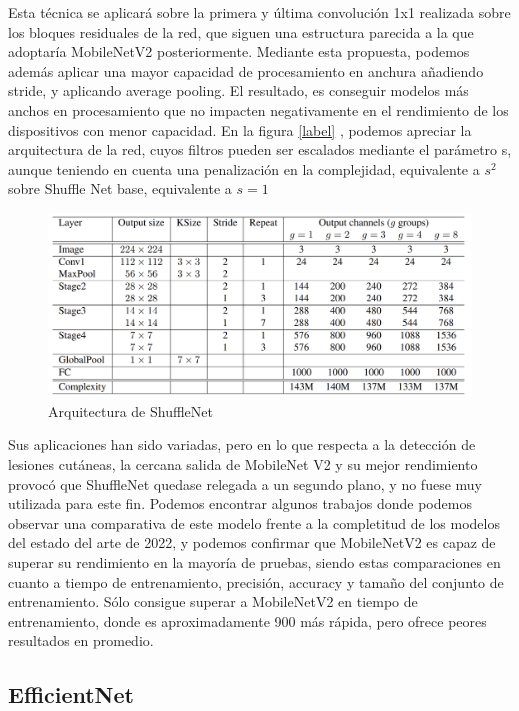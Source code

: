 Esta técnica se aplicará sobre la primera y última convolución 1x1 realizada sobre los bloques residuales de la red, que siguen una estructura parecida a la que adoptaría MobileNetV2 posteriormente. Mediante esta propuesta, podemos además aplicar una mayor capacidad de procesamiento en anchura añadiendo stride, y aplicando average pooling. El resultado, es conseguir modelos más anchos en procesamiento que no impacten negativamente en el rendimiento de los dispositivos con menor capacidad. En la figura \ref{label} , podemos apreciar la arquitectura de la red, cuyos filtros pueden ser escalados mediante el parámetro s, aunque teniendo en cuenta una penalización en la complejidad, equivalente a $s^2$ sobre Shuffle Net base, equivalente a $s=1$

\begin{figure}[H]
		\label{arquitecturashuffle}
		\centering
		\includegraphics[scale = 0.2]{imagenes/arquitecturashuffle.png}
		\caption{Arquitectura de ShuffleNet}
	\end{figure}

Sus aplicaciones han sido variadas, pero en lo que respecta a la detección de lesiones cutáneas, la cercana salida de MobileNet V2 y su mejor rendimiento provocó que ShuffleNet quedase relegada a un segundo plano, y no fuese muy utilizada para este fin. Podemos encontrar algunos trabajos \cite{shuffleapp} donde podemos observar una comparativa de este modelo frente a la completitud de los modelos del estado del arte de 2022, y podemos confirmar que  MobileNetV2 es capaz de superar su rendimiento en la mayoría de pruebas, siendo estas comparaciones en cuanto a tiempo de entrenamiento, precisión, accuracy y tamaño del conjunto de entrenamiento. Sólo consigue superar a MobileNetV2 en tiempo de entrenamiento, donde es aproximadamente 900 más rápida, pero ofrece peores resultados en promedio.

\subsection{EfficientNet}

